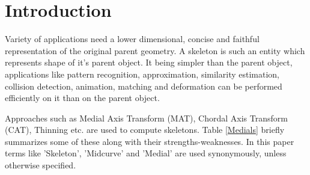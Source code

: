 \section{Introduction}

Variety of applications need a lower dimensional, concise and faithful representation of the original parent geometry. A skeleton is such an entity which represents shape of it's parent object. It being simpler than the parent object, applications like pattern recognition, approximation, similarity estimation, collision detection, animation, matching and deformation can be performed efficiently on it than on the parent object. 

Approaches such as Medial Axis Transform (MAT),  Chordal Axis Transform (CAT), Thinning etc. are used to compute skeletons. Table \ref{Medials} briefly summarizes some of these along with their strengths-weaknesses. In this paper terms like 'Skeleton', 'Midcurve' and 'Medial' are used synonymously, unless otherwise specified.

